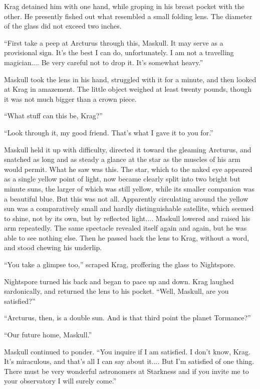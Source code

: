 Krag detained him with one hand, while groping in his breast pocket with the other. He presently fished out what resembled a small folding lens. The diameter of the glass did not exceed two inches.

``First take a peep at Arcturus through this, Maskull. It may serve as a provisional sign. It's the best I can do, unfortunately. I am not a travelling magician.... Be very careful not to drop it. It's somewhat heavy.''

Maskull took the lens in his hand, struggled with it for a minute, and then looked at Krag in amazement. The little object weighed at least twenty pounds, though it was not much bigger than a crown piece.

``What stuff can this be, Krag?''

``Look through it, my good friend. That's what I gave it to you for.''

Maskull held it up with difficulty, directed it toward the gleaming Arcturus, and snatched as long and as steady a glance at the star as the muscles of his arm would permit. What he saw was this. The star, which to the naked eye appeared as a single yellow point of light, now became clearly split into two bright but minute suns, the larger of which was still yellow, while its smaller companion was a beautiful blue. But this was not all. Apparently circulating around the yellow sun was a comparatively small and hardly distinguishable satellite, which seemed to shine, not by its own, but by reflected light.... Maskull lowered and raised his arm repeatedly. The same spectacle revealed itself again and again, but he was able to see nothing else. Then he passed back the lens to Krag, without a word, and stood chewing his underlip.

``You take a glimpse too,'' scraped Krag, proffering the glass to Nightspore.

Nightspore turned his back and began to pace up and down. Krag laughed sardonically, and returned the lens to his pocket. ``Well, Maskull, are you satisfied?''

``Arcturus, then, is a double sun. And is that third point the planet Tormance?''

``Our future home, Maskull.''

Maskull continued to ponder. ``You inquire if I am satisfied. I don't know, Krag. It's miraculous, and that's all I can say about it.... But I'm satisfied of one thing. There must be very wonderful astronomers at Starkness and if you invite me to your observatory I will surely come.''

